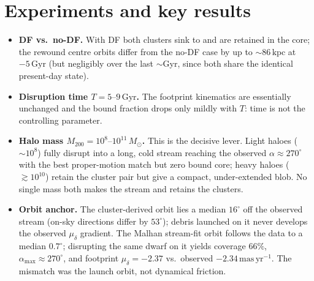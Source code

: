\documentclass[11pt]{article}
\newcommand{\Msun}{M_\odot}
\newcommand{\kpc}{\,\mathrm{kpc}}
\newcommand{\Gyr}{\,\mathrm{Gyr}}
\begin{document}
\section{Experiments and key results}
\begin{itemize}
\item \textbf{DF vs.\ no-DF.} With DF both clusters sink to and are retained in
the core; the rewound centre orbits differ from the no-DF case by up to
$\sim86\kpc$ at $-5\Gyr$ (but negligibly over the last $\sim$Gyr, since both
share the identical present-day state).
\item \textbf{Disruption time $T=5\text{--}9\Gyr$.} The footprint kinematics are
essentially unchanged and the bound fraction drops only mildly with $T$: time is
not the controlling parameter.
\item \textbf{Halo mass $M_{200}=10^{8}\text{--}10^{11}\,\Msun$.} This is the
decisive lever. Light haloes ($\sim10^{8}$) fully disrupt into a long, cold
stream reaching the observed $\alpha\!\approx\!270^\circ$ with the best
proper-motion match but zero bound core; heavy haloes ($\gtrsim10^{10}$) retain
the cluster pair but give a compact, under-extended blob. No single mass both
makes the stream and retains the clusters.
\item \textbf{Orbit anchor.} The cluster-derived orbit lies a median $16^\circ$
off the observed stream (on-sky directions differ by $53^\circ$); debris launched
on it never develops the observed $\mu_\delta$ gradient. The Malhan stream-fit
orbit follows the data to a median $0.7^\circ$; disrupting the same dwarf on it
yields coverage $66\%$, $\alpha_{\max}\!\approx\!270^\circ$, and footprint
$\mu_\delta=-2.37$ vs.\ observed $-2.34\,\mathrm{mas\,yr^{-1}}$. The mismatch was
the launch orbit, not dynamical friction.
\end{itemize}
\end{document}
